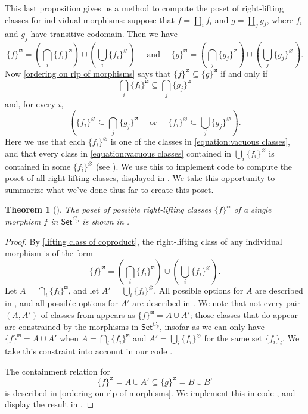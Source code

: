 \documentclass{amsart}
\newcommand{\computerassisted}{\faLaptopCode}
\renewcommand\emptyset\varnothing
\newcommand{\Set}{\mathsf{Set}}
\newcommand{\CpSet}{\Set^{C_p}}
\newcommand{\rlp}[1]{{#1}^{\boxslash}}
\numberwithin{equation}{section}
\newtheorem{theorem}[equation]{Theorem}
\theoremstyle{definition}
\begin{document}
This last proposition gives us a method to compute the poset of right-lifting classes for individual morphisms: suppose that $f = \coprod_i f_i$ and $g = \coprod_j g_j$, where $f_i$ and $g_j$ have transitive codomain. Then we have
\[
	\rlp{\{f\}} =
	\left(\bigcap_i \rlp{\{f_i\}}\right)
	\cup
	\left(\bigcup_i \{f_i\}^\emptyset\right)
	\quad \text{ and } \quad
	\rlp{\{g\}} =
	\left(\bigcap_j \rlp{\{g_j\}}\right)
	\cup
	\left(\bigcup_j \{g_j\}^\emptyset\right).
\]
Now \cref{ordering on rlp of morphisms} says that $\rlp{\{f\}} \subseteq \rlp{\{g\}}$ if and only if
\[
	\bigcap_i \rlp{\{f_i\}}
	\subseteq
	\bigcap_j \rlp{\{g_j\}}
\]
and, for every $i$,
\[
	\left(
	\{f_i\}^\emptyset
	\subseteq
	\bigcap_j \rlp{\{g_j\}}
	\quad \text{ or } \quad
	\{f_i\}^\emptyset
	\subseteq
	\bigcup_j \{g_j\}^\emptyset
	\right).
\]
Here we use that each $\{f_i\}^\emptyset$ is one of the classes in \eqref{equation:vacuous classes}, and that every class in \eqref{equation:vacuous classes} contained in $\bigcup_i \{f_i\}^\emptyset$ is contained in some $\{f_i\}^\emptyset$ (see ).
We use this to implement code \cite{code} to compute the poset of all right-lifting classes, displayed in . We take this opportunity to summarize what we've done thus far to create this poset.

\begin{theorem}[\computerassisted]
	The poset of possible right-lifting classes $\rlp{\{f\}}$ of a single morphism $f$ in $\CpSet$ is shown in .
\end{theorem}

\begin{proof}
	By \cref{lifting class of coproduct}, the right-lifting class of any individual morphism is of the form
	\[
		\rlp{\{f\}} =
		\left(\bigcap_i \rlp{\{f_i\}}\right)
		\cup
		\left(\bigcup_i \{f_i\}^\emptyset\right).
	\]
	Let $A = \bigcap_i \rlp{\{f_i\}}$, and let $A' = \bigcup_i \{f_i\}^\emptyset$. All possible options for $A$ are described in , and all possible options for $A'$ are described in . We note that not every pair $(A,A')$ of classes from  appears as $\rlp{\{f\}} = A \cup A'$; those classes that do appear are constrained by the morphisms in $\CpSet$, insofar as we can only have $\rlp{\{f\}} = A \cup A'$ when $A = \bigcap_i \rlp{\{f_i\}}$ and $A' = \bigcup_i \{f_i\}^\emptyset$ for the same set $\{f_i\}_i$.  We take this constraint into account in our code \cite{code}.

	The containment relation for
	\[
		\rlp{\{f\}} = A \cup A' \subseteq \rlp{\{g\}} = B \cup B'
	\]
	is described in \cref{ordering on rlp of morphisms}. We implement this in code \cite{code}, and display the result in .
\end{proof}
\end{document}
